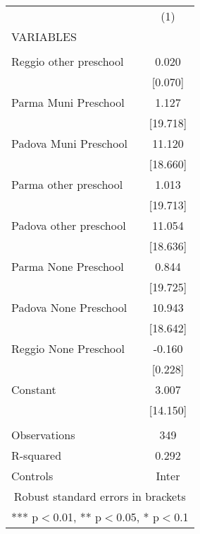 \begin{tabular}{lc} \hline
 & (1) \\
VARIABLES &  \\ \hline
 &  \\
Reggio other preschool & 0.020 \\
 & [0.070] \\
Parma Muni Preschool & 1.127 \\
 & [19.718] \\
Padova Muni Preschool & 11.120 \\
 & [18.660] \\
Parma other preschool & 1.013 \\
 & [19.713] \\
Padova other preschool & 11.054 \\
 & [18.636] \\
Parma None Preschool & 0.844 \\
 & [19.725] \\
Padova None Preschool & 10.943 \\
 & [18.642] \\
Reggio None Preschool & -0.160 \\
 & [0.228] \\
Constant & 3.007 \\
 & [14.150] \\
 &  \\
Observations & 349 \\
R-squared & 0.292 \\
 Controls & Inter \\ \hline
\multicolumn{2}{c}{ Robust standard errors in brackets} \\
\multicolumn{2}{c}{ *** p$<$0.01, ** p$<$0.05, * p$<$0.1} \\
\end{tabular}

